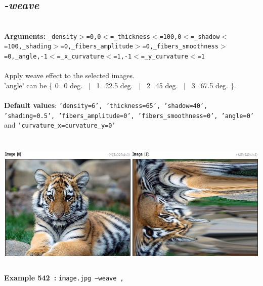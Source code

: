 \documentclass[a4paper,11pt,twoside]{book}
\begin{document}
\subsection{\emph{-weave} }\vspace*{-0.5em}
~\\\textbf{Arguments: } 
{\small \texttt{\_density$>$=0,0$<$=\_thickness$<$=100,0$<$=\_shadow$<$=100,\_shading$>$=0,\_fibers\_amplitude$>$=0,\_fibers\_smoothness$>$=0,\_angle,-1$<$=\_x\_curvature$<$=1,-1$<$=\_y\_curvature$<$=1}}\\~\\
Apply weave effect to the selected images.
~\\'angle' can be \{ 0=0 deg. ~$|$~ 1=22.5 deg. ~$|$~ 2=45 deg. ~$|$~ 3=67.5 deg. \}.
~\\~\\\textbf{Default values}: {\small \texttt{'density=6', 'thickness=65', 'shadow=40', 'shading=0.5', 'fibers\_amplitude=0', 'fibers\_smoothness=0', 'angle=0'} and \texttt{'curvature\_x=curvature\_y=0'}}
\begin{center}\includegraphics[keepaspectratio=true,height=7cm,width=\textwidth]{img/gmic_def542.jpg}\\
{\footnotesize \textbf{Example 542~:} \texttt{image.jpg --weave ,}}
\end{center}
\end{document}
